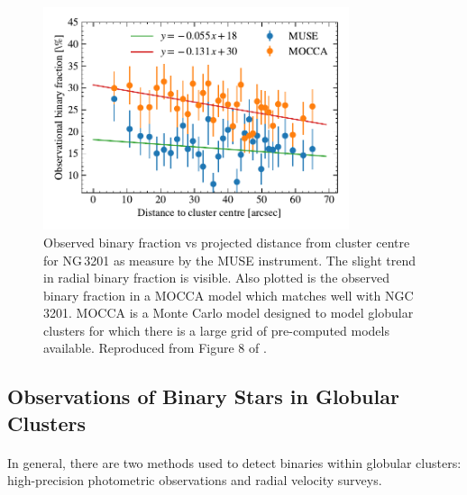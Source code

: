 \begin{figure}
	\centering
	\includegraphics[width=0.8\textwidth]{figures/radial_binarity.pdf}
	\caption{Observed binary fraction vs projected distance from cluster centre for NG\,3201 as measure by
		the MUSE instrument. The slight trend in radial binary fraction is visible. Also plotted is
		the observed binary fraction in a MOCCA model which matches well with NGC\,3201. MOCCA is a
		Monte Carlo model designed to model globular clusters for which there is a large grid of
		pre-computed models available. Reproduced from Figure 8 of \citet{Giesers2019}.}
	\label{fig:1/radial_binary_fraction}
\end{figure}

\subsection{Observations of Binary Stars in Globular Clusters}

\paragraph{}
In general, there are two methods used to detect binaries within globular clusters: high-precision
photometric observations and radial velocity surveys.


